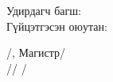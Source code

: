 \vspace{1cm}

\begin{minipage}[t]{0.45\textwidth}
\raggedright
Удирдагч багш: \\
Гүйцэтгэсэн оюутан:
\end{minipage}
\hfill
\begin{minipage}[t]{0.45\textwidth}
\raggedleft
/\supervisorname, Магистр/ \\
/\studentID/ \authorShort/
\end{minipage}

